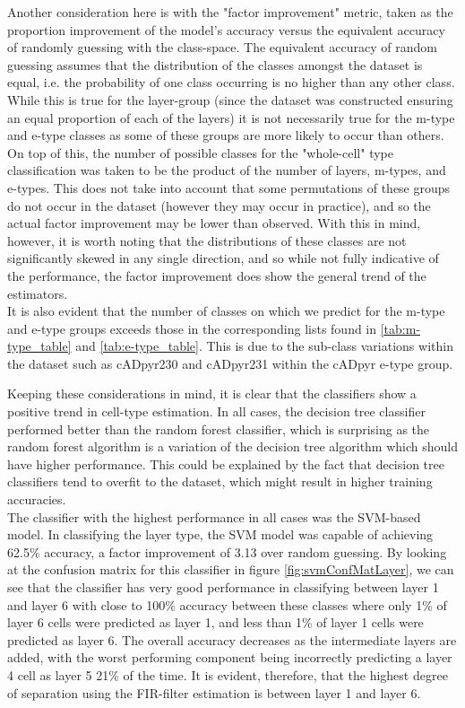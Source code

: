 Another consideration here is with the "factor improvement" metric, taken as the proportion improvement of the model's accuracy versus the equivalent accuracy of randomly guessing with the class-space. The equivalent accuracy of random guessing assumes that the distribution of the classes amongst the dataset is equal, i.e. the probability of one class occurring is no higher than any other class. While this is true for the layer-group (since the dataset was constructed ensuring an equal proportion of each of the layers) it is not necessarily true for the m-type and e-type classes as some of these groups are more likely to occur than others. On top of this, the number of possible classes for the "whole-cell" type classification was taken to be the product of the number of layers, m-types, and e-types. This does not take into account that some permutations of these groups do not occur in the dataset (however they may occur in practice), and so the actual factor improvement may be lower than observed. With this in mind, however, it is worth noting that the distributions of these classes are not significantly skewed in any single direction, and so while not fully indicative of the performance, the factor improvement does show the general trend of the estimators.\\
It is also evident that the number of classes on which we predict for the m-type and e-type groups exceeds those in the corresponding lists found in \ref{tab:m-type_table} and \ref{tab:e-type_table}. This is due to the sub-class variations within the dataset such as cADpyr230 and cADpyr231 within the cADpyr e-type group. 
\par
Keeping these considerations in mind, it is clear that the classifiers show a positive trend in cell-type estimation. In all cases, the decision tree classifier performed better than the random forest classifier, which is surprising as the random forest algorithm is a variation of the decision tree algorithm which should have higher performance. This could be explained by the fact that decision tree classifiers tend to overfit to the dataset, which might result in higher training accuracies.\\
The classifier with the highest performance in all cases was the SVM-based model. In classifying the layer type, the SVM model was capable of achieving 62.5\% accuracy, a factor improvement of 3.13 over random guessing. By looking at the confusion matrix for this classifier in figure \ref{fig:svmConfMatLayer}, we can see that the classifier has very good performance in classifying between layer 1 and layer 6 with close to 100\% accuracy between these classes where only 1\% of layer 6 cells were predicted as layer 1, and less than 1\% of layer 1 cells were predicted as layer 6. The overall accuracy decreases as the intermediate layers are added, with the worst performing component being incorrectly predicting a layer 4 cell as layer 5 21\% of the time. It is evident, therefore, that the highest degree of separation using the FIR-filter estimation is between layer 1 and layer 6.

